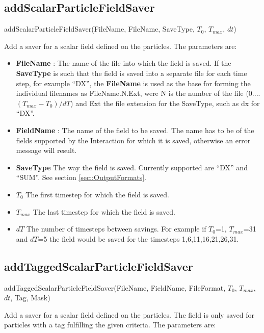 \documentclass{report}
\begin{document}
\subsection{addScalarParticleFieldSaver}

\textsf{addScalarParticleFieldSaver(FileName, FileName, SaveType, $T_0$, $T_{max}$, $dt$)}
\par \medskip

Add a saver for a scalar field defined on the particles. The parameters are:

\begin{itemize}
\item \textbf{FileName} : The name of the file into which the field is saved. If the  \textbf{SaveType} is such that the field is saved into a separate file for each time step, for example ``DX'', the \textbf{FileName} is used as the base for forming the individual filenames as FileName.N.Ext, were N is the number of the file (0....$(T_{max}-T_0)/dT$) and Ext the file extension for the SaveType, such as dx for ``DX''.
\item \textbf{FieldName} : The name of the field to be saved. The name has to be of the fields supported by the Interaction for which it is saved, otherwise an error message will result.
\item \textbf{SaveType} The way the field is saved. Currently supported are ``DX'' and ``SUM''. See section \ref{sec::OutputFormats}.
\item \textbf{$T_0$} The first timestep for which the field is saved.
\item \textbf{$T_{max}$} The last timestep for which the field is saved.
\item \textbf{$dT$} The number of timesteps between savings. For example if $T_0$=1, $T_{max}$=31 and $dT$=5 the field would be saved for the timesteps 1,6,11,16,21,26,31.
\end{itemize}

\subsection{addTaggedScalarParticleFieldSaver}

\textsf{addTaggedScalarParticleFieldSaver(FileName, FieldName, FileFormat, $T_0$, $T_{max}$, $dt$, Tag, Mask)}
\par \medskip

Add a saver for a scalar field defined on the particles. The field is only saved for particles with a tag fulfilling the given criteria. The parameters are:
\end{document}

